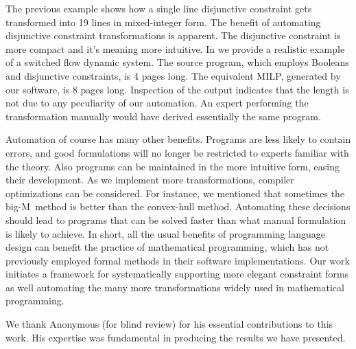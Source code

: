 \documentclass[preprint]{sigplanconf}%
\theoremstyle{remark}
\begin{document}
The previous example shows how a single line disjunctive constraint gets
transformed into 19 lines in mixed-integer form. The benefit of automating
disjunctive constraint transformations is apparent. The disjunctive constraint
is more compact and it's meaning more intuitive. In \cite{a3000} we provide a
realistic example of a switched flow dynamic system. The source program, which
employs Booleans and disjunctive constraints, is 4 pages long. The equivalent
MILP, generated by our software, is 8 pages long. Inspection of the output
indicates that the length is not due to any peculiarity of our automation. An
expert performing the transformation manually would have derived essentially
the same program.

Automation of course has many other benefits. Programs are less likely to
contain errors, and good formulations will no longer be restricted to experts
familiar with the theory. Also programs can be maintained in the more
intuitive form, easing their development. As we implement more
transformations, compiler optimizations can be considered. For instance, we
mentioned that sometimes the big-M\ method is better than the convex-hull
method. Automating these decisions should lead to programs that can be solved
faster than what manual formulation is likely to achieve. In short, all the
usual benefits of programming language design can benefit the practice of
mathematical programming, which has not previously employed formal methods in
their software implementations. Our work initiates a framework for
systematically supporting more elegant constraint forms as well automating the
many more transformations \cite{Liberti2007} widely used in mathematical programming.

\acks


We thank Anonymous (for blind review) for his essential contributions to this
work. His expertise was fundamental in producing the results we have presented.%


%
\end{document}
